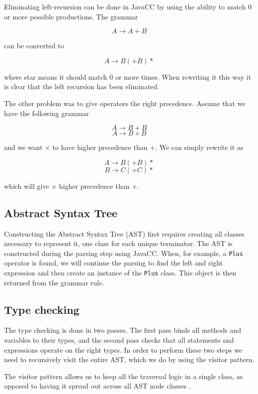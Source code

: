 \documentclass[a4paper]{article}
\begin{document}
Eliminating left-recursion can be done in JavaCC by using the
ability to match $0$ or more possible productions. The grammar

$$A \rightarrow A + B$$

can be converted to

$$A \rightarrow B (+ B)*$$

where star means it should match $0$ or more times. When rewriting it this way
it is clear that the left recursion has been eliminated.

The other problem was to give operators the right precedence. Assume that we have the
following grammar

$$A \rightarrow B + B$$
$$A \rightarrow B \times B$$

and we want $\times$ to have higher precedence than $+$. We can simply rewrite it as

$$A \rightarrow B (+ B)*$$
$$B \rightarrow C (\times C)*$$

which will give $\times$ higher precedence than $+$.

\subsection{Abstract Syntax Tree}

Constructing the Abstract Syntax Tree (AST) first requires creating all classes
necessary to represent it, one class for each unique terminator. The AST is
constructed during the parsing step using JavaCC. When, for example, a \texttt{Plus}
operator is found, we will continue the parsing to find the left and right
expression and then create an instance of the \texttt{Plus} class. This object is then
returned from the grammar rule.

\subsection{Type checking}

The type checking is done in two passes. The first pass binds all methods and
variables to their types, and the second pass checks that all statements and
expressions operate on the right types. In order to perform these two steps we
need to recursively visit the entire AST, which we do by using the visitor
pattern.

The visitor pattern allows us to keep all the traversal logic in a single class,
as opposed to having it spread out across all AST node classes
\cite{oodesignvisitor}.
\end{document}
